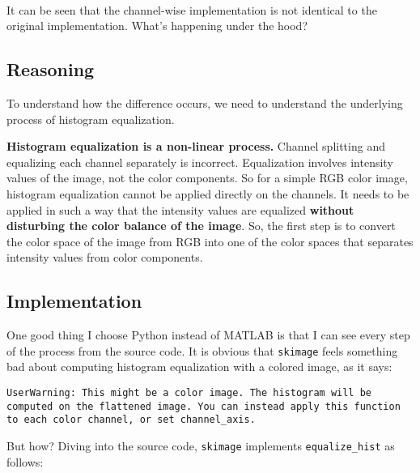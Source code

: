 \documentclass[11pt]{article}
\begin{document}
    \begin{center}
    \end{center}
    { \hspace*{\fill} \\}
    
    It can be seen that the channel-wise implementation is not identical to
the original implementation. What's happening under the hood?

    \hypertarget{reasoning}{%
\subsection{Reasoning}\label{reasoning}}

To understand how the difference occurs, we need to understand the
underlying process of histogram equalization.

\textbf{Histogram equalization is a non-linear process.} Channel
splitting and equalizing each channel separately is incorrect.
Equalization involves intensity values of the image, not the color
components. So for a simple RGB color image, histogram equalization
cannot be applied directly on the channels. It needs to be applied in
such a way that the intensity values are equalized \textbf{without
disturbing the color balance of the image}. So, the first step is to
convert the color space of the image from RGB into one of the color
spaces that separates intensity values from color components.

    \hypertarget{implementation}{%
\subsection{Implementation}\label{implementation}}

One good thing I choose Python instead of MATLAB is that I can see every
step of the process from the source code. It is obvious that
\texttt{skimage} feels something bad about computing histogram
equalization with a colored image, as it says:

\begin{verbatim}
UserWarning: This might be a color image. The histogram will be computed on the flattened image. You can instead apply this function to each color channel, or set channel_axis.
\end{verbatim}

But how? Diving into the source code, \texttt{skimage} implements
\texttt{equalize\_hist} as follows:
\end{document}

